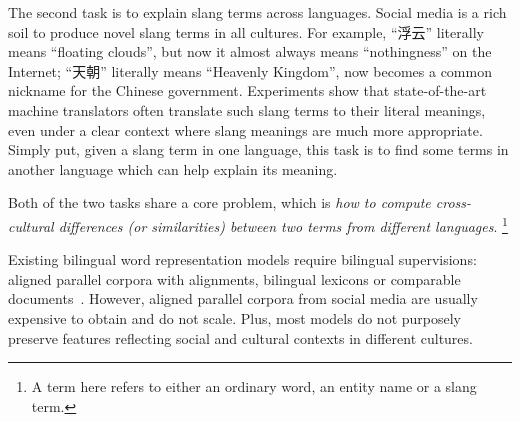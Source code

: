 The second task is to explain slang terms across languages. 
Social media is a rich soil to produce novel slang 
terms in all cultures. 
For example, ``浮云'' literally means ``floating clouds'', 
but now it almost always means ``nothingness'' on the Internet; 
``天朝'' literally means ``Heavenly Kingdom'', 
now becomes a common nickname for the Chinese government.
Experiments show that state-of-the-art machine translators 
often translate such slang terms to their literal meanings, 
even under a clear context where slang meanings are much more appropriate.
Simply put, given a slang term in one language, this task is to find
some terms in another language which can help explain its meaning. 

Both of the two tasks share a core problem, which is \textit{how to compute 
cross-cultural differences (or similarities) between two terms from 
different languages}.
\footnote{A term here refers to either an ordinary word, an entity name or a slang term. }


Existing bilingual word representation models require bilingual supervisions: 
aligned parallel corpora with alignments, bilingual lexicons or 
comparable documents~\cite{upadhyay2016cross}.
However, aligned parallel corpora from social media are usually expensive to
obtain and do not scale. Plus, most models do not purposely preserve 
features reflecting social and cultural contexts in different cultures.

